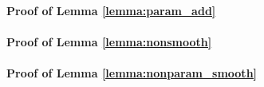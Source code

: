 \documentclass[12pt]{article}
\newtheorem{lemma}{Lemma}
\begin{document}
%	
%	
%	

\paragraph{Proof of Lemma \ref{lemma:param_add}}

\paragraph{Proof of Lemma \ref{lemma:nonsmooth}}

\paragraph{Proof of Lemma \ref{lemma:nonparam_smooth}}


\bigskip



\end{document}
